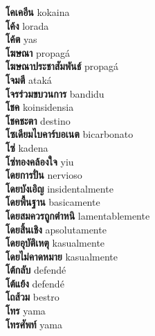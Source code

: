 \textbf{ โคเคอีน  } kokaina \\
\textbf{ โค้ง  } lorada \\
\textbf{ โค้ต  } yas \\
\textbf{ โฆษณา  } propagá \\
\textbf{ โฆษณาประชาสัมพันธ์  } propagá \\
\textbf{ โจมตี  } ataká \\
\textbf{ โจรร่วมขบวนการ  } bandidu \\
\textbf{ โชค  } koinsidensia \\
\textbf{ โชคชะตา  } destino \\
\textbf{ โซเดียมไบคาร์บอเนต  } bicarbonato \\
\textbf{ โซ่  } kadena \\
\textbf{ โซ่ทองคล้องใจ  } yiu \\
\textbf{ โดยการปั่น  } nervioso \\
\textbf{ โดยบังเอิญ  } insidentalmente \\
\textbf{ โดยพื้นฐาน  } basicamente \\
\textbf{ โดยสมควรถูกตำหนิ  } lamentablemente \\
\textbf{ โดยสิ้นเชิง  } apsolutamente \\
\textbf{ โดยอุบัติเหตุ  } kasualmente \\
\textbf{ โดยไม่คาดหมาย  } kasualmente \\
\textbf{ โต้กลับ  } defendé \\
\textbf{ โต้แย้ง  } defendé \\
\textbf{ โถส้วม  } bestro \\
\textbf{ โทร  } yama \\
\textbf{ โทรศัพท์  } yama \\
